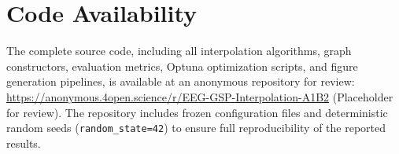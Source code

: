 \section{Code Availability}

The complete source code, including all interpolation algorithms, graph constructors, evaluation metrics, Optuna optimization scripts, and figure generation pipelines, is available at an anonymous repository for review: \url{https://anonymous.4open.science/r/EEG-GSP-Interpolation-A1B2} (Placeholder for review). The repository includes frozen configuration files and deterministic random seeds (\texttt{random\_state=42}) to ensure full reproducibility of the reported results.
